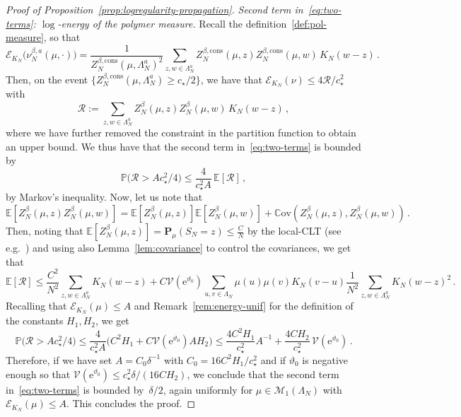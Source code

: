 \documentclass[11pt]{amsart}
\numberwithin{equation}{section}
\newcommand*{\EE}{\mathbb{E}}
\newcommand*{\bP}{\mathbf{P}}
\newcommand{\e}{\mathrm{e}}
\newcommand*{\cons}{\mathrm{cons}}
\newcommand*{\Cov}{\mathbb{C}\mathrm{ov}}
\theoremstyle{plain}
\theoremstyle{definition}
\theoremstyle{remark}
\begin{document}
\begin{proof}[Proof of Proposition~\ref{prop:logregularity-propagation}]
\smallskip
\noindent
\textit{Second term in~\eqref{eq:two-terms}: \(\log\)-energy of the polymer measure.}
Recall the definition~\eqref{def:pol-measure}, so that 
\[
\mathcal{E}_{K_N}\big(\nu_N^{\beta,a}(\mu,\cdot) \big) =  \frac{1}{Z_N^{\beta,\cons}(\mu,\Lambda_N^a)^2} \sum_{z,w\in \Lambda_N^a} Z_N^{\beta,\cons}(\mu,z)Z_N^{\beta,\cons}(\mu,w) \, K_N(w-z) \,.
\]
Then, on the event $\{Z_N^{\beta,\cons}(\mu,\Lambda_N^a)\ge c_\star/2\}$, we have that \(\mathcal{E}_{K_N}(\nu)\le 4 \mathcal R/c_\star^2 \) with 
\[
\mathcal R := \sum_{z,w\in \Lambda_N^a} Z_N^{\beta}(\mu,z)Z_N^{\beta}(\mu,w) \, K_N(w-z) \,,
\]
where we have further removed the constraint in the partition function to obtain an upper bound.
We thus have that the second term in~\eqref{eq:two-terms} is bounded by 
\[
       \mathbb{P}\big( \mathcal R > A c_\star^2/4\big) \leq \frac{4}{c_{\star}^2 A}\, \EE[\mathcal R] \,, 
\]
by Markov's inequality.
Now, let us note that
$$
\mathbb{E}[Z_N^{\beta}(\mu,z)Z_N^{\beta}(\mu,w)]
= \mathbb{E}[Z_N^{\beta}(\mu,z)] \mathbb{E}[Z_N^{\beta}(\mu,w)] +\Cov(Z_N^{\beta}(\mu,z),Z_N^{\beta}(\mu,w)) \,.
$$
Then, noting that \(\mathbb{E}[Z_N^{\beta}(\mu,z)] = \bP_{\mu}(S_N =z) \leq \frac{C}{N}\) by the local-CLT (see e.g.\ \cite[Prop.~2.4.4]{LL10}) and using also Lemma~\ref{lem:covariance} to control the covariances, we get that 
\[     
\EE[\mathcal R] \leq \frac{C^2}{N^2}  \sum_{z,w\in \Lambda_N^a} K_N(w-z) + C \mathcal{V}(\e^{\vartheta_0}) \sum_{u,v \in \Lambda_N} \mu(u)\mu(v) K_N(v-u)  \frac{1}{N^2} \sum_{z,w\in \Lambda_N^a} K_N(w-z)^2 \,.
\]
Recalling that \(\mathcal{E}_{K_N}(\mu)\leq A\) and Remark~\ref{rem:energy-unif} for the definition of the constants \(H_1,H_2\), we get
\[
\mathbb{P}\big( \mathcal R > A c_\star^2/4\big) \leq  \frac{4}{c_{\star}^2 A} \Big(C^2 H_1 + C \mathcal{V}(\e^{\vartheta_0}) A H_2 \Big) \leq \frac{4 C^2 H_1}{ c_{\star}^2} A^{-1} + \frac{4 C H_2 }{ c_{\star}^2}\, \mathcal{V}(\e^{\vartheta_0}) \,.
\]
Therefore, if we have set \(A = C_0 \delta^{-1}\) with \(C_0 = 16 C^2 H_1/c_{\star}^2\) and if \(\vartheta_0\) is negative enough so that \(\mathcal{V}(\e^{\vartheta_0})  \leq c_{\star}^2\delta/(16 C H_2)\), we conclude that the second term in~\eqref{eq:two-terms} is bounded by~\(\delta/2\), again uniformly for \(\mu\in \mathcal{M}_1(\Lambda_N)\) with \(\mathcal{E}_{K_N}(\mu) \leq A\).
This concludes the proof.
\end{proof}
\end{document}
